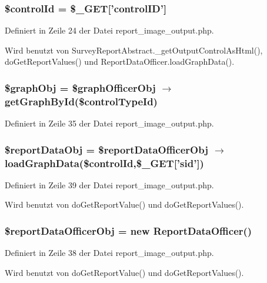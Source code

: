 \subsubsection{\setlength{\rightskip}{0pt plus 5cm}\$controlId = \$\_\-GET['controlID']}\label{report__image__output_8php_d3bc7242088fe3938d5b99cecf6685b8}




Definiert in Zeile 24 der Datei report\_\-image\_\-output.php.

Wird benutzt von SurveyReportAbstract.\_\-getOutputControlAsHtml(), doGetReportValues() und ReportDataOfficer.loadGraphData().
\subsubsection{\setlength{\rightskip}{0pt plus 5cm}\$graphObj = \$graphOfficerObj $\rightarrow$ getGraphById(\$controlTypeId)}\label{report__image__output_8php_0e35e12258bfc8445213ad172a725d69}




Definiert in Zeile 35 der Datei report\_\-image\_\-output.php.
\subsubsection{\setlength{\rightskip}{0pt plus 5cm}\$reportDataObj = \$reportDataOfficerObj $\rightarrow$ loadGraphData(\$controlId,\$\_\-GET['sid'])}\label{report__image__output_8php_cb074c9f3af5467b0e09f80ef65853c2}




Definiert in Zeile 39 der Datei report\_\-image\_\-output.php.

Wird benutzt von doGetReportValue() und doGetReportValues().
\subsubsection{\setlength{\rightskip}{0pt plus 5cm}\$reportDataOfficerObj = new {\bf ReportDataOfficer}()}\label{report__image__output_8php_cbe15726ad3dd68a92d4694ef3829b01}




Definiert in Zeile 38 der Datei report\_\-image\_\-output.php.

Wird benutzt von doGetReportValue() und doGetReportValues().